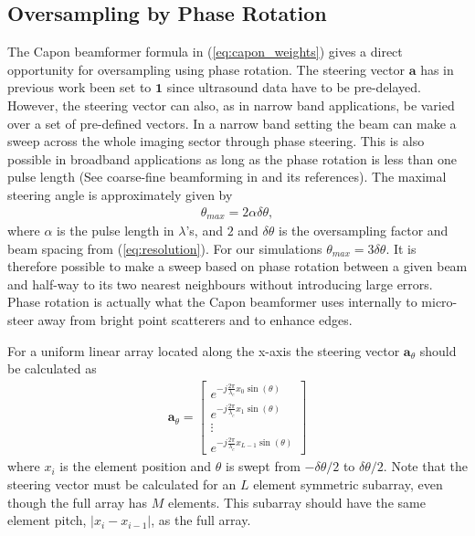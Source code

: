 \documentclass[draftcls]{IEEEtran}
\renewcommand{\vec}[1]{\mathbf{#1}}
\begin{document}
\subsection{Oversampling by Phase Rotation}
The Capon beamformer formula in (\ref{eq:capon_weights}) gives a direct opportunity for oversampling using phase rotation. The steering vector $\vec{a}$ has in previous work been set to $\vec{1}$ since ultrasound data have to be pre-delayed. However, the steering vector can also, as in narrow band applications, be varied over a set of pre-defined vectors. In a narrow band setting the beam can make a sweep across the whole imaging sector through phase steering. This is also possible in broadband applications as long as the phase rotation is less than one pulse length (See coarse-fine beamforming in \cite{Thomenius} and its references). The maximal steering angle is approximately given by
\begin{align}
\theta_{max} = 2\alpha \delta\theta,
\end{align}
where $\alpha$ is the pulse length in $\lambda$'s, and $2$ and $\delta\theta$ is the oversampling factor and beam spacing from (\ref{eq:resolution}). For our simulations $\theta_{max} = 3\delta\theta$.
It is therefore possible to make a sweep based on phase rotation between a given beam and half-way to its two nearest neighbours without introducing large errors. Phase rotation is actually what the Capon beamformer uses internally to micro-steer away from bright point scatterers and to enhance edges.

For a uniform linear array located along the x-axis the steering vector $\vec{a}_\theta$ should be calculated as 
\begin{align}
\vec{a}_\theta = 
\begin{bmatrix}
e^{-j\frac{2\pi}{\lambda_c}x_0\sin(\theta)} \\
e^{-j\frac{2\pi}{\lambda_c}x_1\sin(\theta)} \\
\vdots \\ 
e^{-j\frac{2\pi}{\lambda_c}x_{L-1}\sin(\theta)}
\end{bmatrix}
\end{align}
where $x_i$ is the element position and $\theta$ is swept from $-\delta\theta/2$ to $\delta\theta/2$. Note that the steering vector must be calculated for an $L$ element symmetric subarray, even though the full array has $M$ elements. This subarray should have the same element pitch, $|x_i - x_{i-1}|$, as the full array. %
\end{document}
